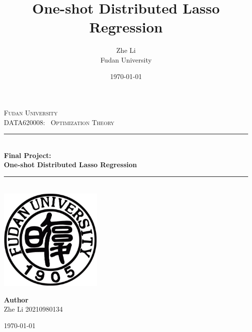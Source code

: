 \documentclass[11pt,en,authoryear]{elegantpaper}
\title{One-shot Distributed Lasso Regression}
\author{Zhe Li \\ Fudan University}
\institute{\href{https://sds.fudan.edu.cn/}{School of Data Science}}
\date{\today}
\numberwithin{equation}{section}
\newcommand{\HRule}{\rule{\linewidth}{0.5mm}}
\begin{document}
\setlength{\belowcaptionskip}{-1cm} 

\begin{titlepage}
\begin{center}
\textsc{\LARGE Fudan University}\\[1.5cm]
\textsc{\Large DATA620008: \ Optimization Theory}\\[0.5cm]
\HRule \\[0.6cm]
{ \huge \bfseries Final Project: }\\[0.4cm]
{ \huge \bfseries One-shot Distributed Lasso Regression}\\[0.4cm]

\HRule \\[1.5cm]
\includegraphics[width=2in]{logo.jpg}\\[1cm]

\begin{minipage}{0.4\textwidth}
\begin{flushleft} \large


\begin{center}
\vspace{0.5cm}
\textbf{Author}\\
\vspace{0.4cm}
Zhe Li \hspace*{0.8cm} 20210980134\\
\end{center}
\end{flushleft}
\end{minipage}
\vfill
{\large \today}
\end{center}
\end{titlepage}

\tableofcontents

\newpage

\maketitle
\end{document}
